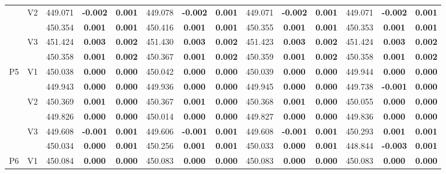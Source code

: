 \documentclass[12pt,a4paper]{article}
\begin{document}
\begin{sidewaystable}[H]
{\begin{tabular}{cc|ccc|ccc|ccc|ccc|}
   & \multirow{2}{*}{V2} & 449.071 & \textbf{-0.002} & \textbf{0.001} & 449.078 & \textbf{-0.002} & \textbf{0.001} & 449.071 & \textbf{-0.002} & \textbf{0.001} & 449.071 & \textbf{-0.002} & \textbf{0.001} \\ 
   &  & 450.354 & \textbf{0.001} & \textbf{0.001} & 450.416 & \textbf{0.001} & \textbf{0.001} & 450.355 & \textbf{0.001} & \textbf{0.001} & 450.353 & \textbf{0.001} & \textbf{0.001} \\ 
   & \multirow{2}{*}{V3} & 451.424 & \textbf{0.003} & \textbf{0.002} & 451.430 & \textbf{0.003} & \textbf{0.002} & 451.423 & \textbf{0.003} & \textbf{0.002} & 451.424 & \textbf{0.003} & \textbf{0.002} \\ 
   &  & 450.358 & \textbf{0.001} & \textbf{0.002} & 450.367 & \textbf{0.001} & \textbf{0.002} & 450.359 & \textbf{0.001} & \textbf{0.002} & 450.358 & \textbf{0.001} & \textbf{0.002} \\ 
   \hline \hline\multirow{6}{*}{P5} & \multirow{2}{*}{V1} & 450.038 & \textbf{0.000} & \textbf{0.000} & 450.042 & \textbf{0.000} & \textbf{0.000} & 450.039 & \textbf{0.000} & \textbf{0.000} & 449.944 & \textbf{0.000} & \textbf{0.000} \\ 
   &  & 449.943 & \textbf{0.000} & \textbf{0.000} & 449.936 & \textbf{0.000} & \textbf{0.000} & 449.945 & \textbf{0.000} & \textbf{0.000} & 449.738 & \textbf{-0.001} & \textbf{0.000} \\ 
   & \multirow{2}{*}{V2} & 450.369 & \textbf{0.001} & \textbf{0.000} & 450.367 & \textbf{0.001} & \textbf{0.000} & 450.368 & \textbf{0.001} & \textbf{0.000} & 450.055 & \textbf{0.000} & \textbf{0.000} \\ 
   &  & 449.826 & \textbf{0.000} & \textbf{0.000} & 450.014 & \textbf{0.000} & \textbf{0.000} & 449.827 & \textbf{0.000} & \textbf{0.000} & 449.836 & \textbf{0.000} & \textbf{0.000} \\ 
   & \multirow{2}{*}{V3} & 449.608 & \textbf{-0.001} & \textbf{0.001} & 449.606 & \textbf{-0.001} & \textbf{0.001} & 449.608 & \textbf{-0.001} & \textbf{0.001} & 450.293 & \textbf{0.001} & \textbf{0.001} \\ 
   &  & 450.034 & \textbf{0.000} & \textbf{0.001} & 450.256 & \textbf{0.001} & \textbf{0.001} & 450.033 & \textbf{0.000} & \textbf{0.001} & 448.844 & \textbf{-0.003} & \textbf{0.001} \\ 
   \hline \hline\multirow{6}{*}{P6} & \multirow{2}{*}{V1} & 450.084 & \textbf{0.000} & \textbf{0.000} & 450.083 & \textbf{0.000} & \textbf{0.000} & 450.083 & \textbf{0.000} & \textbf{0.000} & 450.083 & \textbf{0.000} & \textbf{0.000} \\ 

\end{tabular}}
\end{sidewaystable}
\end{document}
